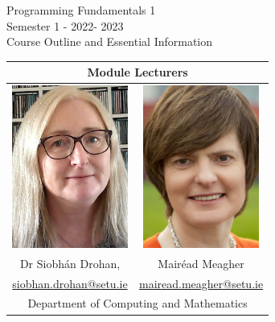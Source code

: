 \documentclass{article}
\author{Dr Siobh\'an Drohan, Mair\'ead Meagher, W.I.T}
\newcommand\fullExTitle{Programming Fundamentals 1 \\Semester 1 - 2022- 2023}
\begin{document}
\begin{Huge}
	\begin{center}
	\fullExTitle \\
    \vspace{1cm}
    Course Outline and Essential Information
    \vspace{.1cm}
    \end{center}
\end{Huge}
\vspace{1.5cm}
\begin{center}
    \begin{tabular}{|c |  c | }
    \hline
    \multicolumn{2}{|c|}{Module Lecturers} \\
    \hline
    \includegraphics[width=1.5in]{img/siobhan.png} &          \includegraphics[width=1.5in]{img/mairead.png} \\ 

       Dr Siobh\'an Drohan, & Mair\'ead Meagher  \\  
       \href{mailto:siobhan.drohan@setu.ie}{siobhan.drohan@setu.ie} & \href{mailto:mairead.meagher@setu.ie}{mairead.meagher@setu.ie} \\
  
    \hline
    \multicolumn{2}{|c|}{Department of Computing and Mathematics} \\
     \hline

  
    \end{tabular}
\end{center}
\end{document}
